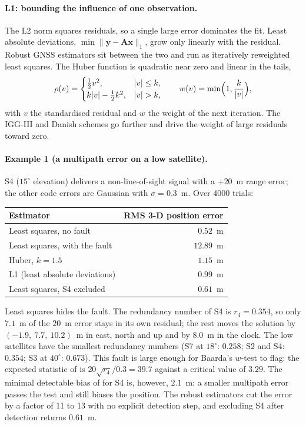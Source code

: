 \documentclass[main.tex]{subfiles}
\begin{document}
\paragraph{L1: bounding the influence of one observation.}
The L2 norm squares residuals, so a single large error dominates the fit.
Least absolute deviations, $\min\lVert\bm{y}-\bm{A}\bm{x}\rVert_1$, grow
only linearly with the residual.  Robust GNSS estimators sit between the two
and run as iteratively reweighted least squares.  The Huber function is
quadratic near zero and linear in the tails,
\begin{equation}
\rho(v) =
\begin{cases}
\tfrac12 v^2, & |v| \le k, \\
k|v| - \tfrac12 k^2, & |v| > k,
\end{cases}
\qquad
w(v) = \min\Bigl(1, \frac{k}{|v|}\Bigr),
\label{eq:la-huber}
\end{equation}
with $v$ the standardised residual and $w$ the weight of the next
iteration.  The IGG-III and Danish schemes go further and drive the weight
of large residuals toward zero.

\paragraph{Example 1 (a multipath error on a low satellite).}
\label{la:ex1}%
S4 ($15^\circ$ elevation) delivers a non-line-of-sight signal with a
$+20$~m range error; the other code errors are Gaussian with
$\sigma = 0.3$~m.  Over 4000 trials:
\begin{center}
\small
\begin{tabular}{@{}lr@{}}
\toprule
Estimator & RMS 3-D position error \\
\midrule
Least squares, no fault & $0.52$~m \\
Least squares, with the fault & $12.89$~m \\
Huber, $k = 1.5$ & $1.15$~m \\
L1 (least absolute deviations) & $0.99$~m \\
Least squares, S4 excluded & $0.61$~m \\
\bottomrule
\end{tabular}
\end{center}
Least squares hides the fault.  The redundancy number of S4 is
$r_4 = 0.354$, so only $7.1$~m of the $20$~m error stays in its own
residual; the rest moves the solution by $(-1.9,\ 7.7,\ 10.2)$~m in east,
north and up and by $8.0$~m in the clock.  The low satellites have the
smallest redundancy numbers (S7 at $18^\circ$: $0.258$; S2 and S4:
$0.354$; S3 at $40^\circ$: $0.673$).  This fault is large enough for
Baarda's $w$-test \cite{baarda1968testing} to flag: the expected statistic
of  is
$20\sqrt{r_4}/0.3 = 39.7$ against a critical value of $3.29$.  The minimal
detectable bias of  for S4 is, however,
$2.1$~m: a smaller multipath error passes the test and still biases the
position.  The robust estimators cut the error by a factor of 11 to 13 with
no explicit detection step, and excluding S4 after detection returns
$0.61$~m.
\end{document}
